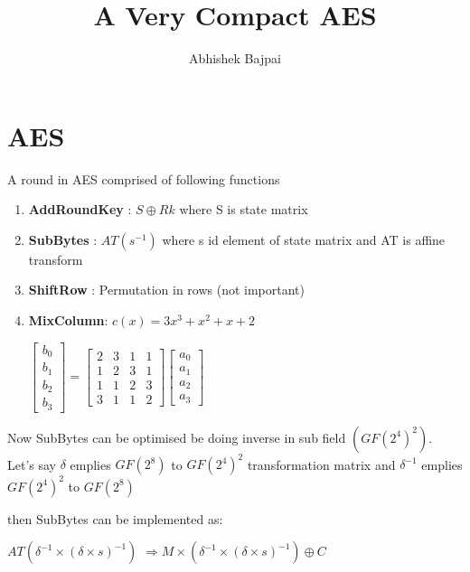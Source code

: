 \documentclass[a4paper,11pt]{article}
\title{A Very Compact AES}
\author{Abhishek Bajpai}
\begin{document}
\maketitle
\tableofcontents

\begin{abstract}
\end{abstract}

\section{AES}
A round in AES comprised of following functions

\begin{enumerate}
  \item \textbf{AddRoundKey} : $S \oplus Rk$ where S is state matrix
  \item \textbf{SubBytes} : $AT(s^{-1})$ where s id element of state matrix and AT is affine transform
  \item \textbf{ShiftRow} : Permutation in rows (not important)
  \item \textbf{MixColumn}:  $c(x)=3x^{3}+x^{2}+x+2$
  

  ${\begin{bmatrix}b_{0}\\b_{1}\\b_{2}\\b_{3}\end{bmatrix}}={\begin{bmatrix}2&3&1&1\\1&2&3&1\\1&1&2&3\\3&1&1&2\end{bmatrix}}{\begin{bmatrix}a_{0}\\a_{1}\\a_{2}\\a_{3}\end{bmatrix}}$
  
\end{enumerate}

Now SubBytes can be optimised be doing inverse in sub field $(GF(2^4)^2)$.
Let's say $\delta$ emplies $GF(2^8)$ to $GF(2^4)^2$ transformation matrix and $\delta^{-1}$ emplies $GF(2^4)^2$ to $GF(2^8)$ 

then SubBytes can be implemented as:

$AT(\delta^{-1}\times (\delta \times s)^{-1})$
$\Rightarrow M \times (\delta^{-1} \times (\delta \times s)^{-1}) \oplus C$
\end{document}
